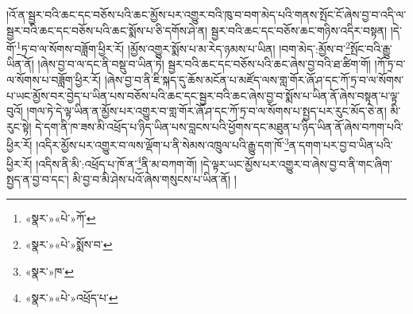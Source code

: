 །འོ་ན་སྦྱར་བའི་ཆང་དང་བཅོས་པའི་ཆང་མྱོས་པར་འགྱུར་བའི་ཁུ་བ་བག་མེད་པའི་གནས་སྤོང་ངོ་ཞེས་བྱ་བ་འདི་ལ་སྦྱར་བའི་ཆང་དང་བཅོས་པའི་ཆང་སྨོས་པ་ཅི་དགོས་ཤེ་ན། སྦྱར་བའི་ཆང་དང་བཅོས་ཆང་གཉིས་འདིར་བསྟན། །དེ་གོ་\footnote{«སྣར་»«པེ་»ཀོ་}ཏྲ་བ་ལ་སོགས་བཟློག་ཕྱིར་རོ། །མྱོས་འགྱུར་སྨོས་པ་མ་རེད་ཉམས་པ་ཡིན། །བག་མེད་:མྱོས་བ་\footnote{«སྣར་»«པེ་»སྨོས་བ་}སྤོང་བའི་རྒྱུ་ཡིན་ནོ། །ཞེས་བྱ་བ་ལ་དང་ནི་བསྡུ་བ་ཡིན་ཏེ། སྦྱར་བའི་ཆང་དང་བཅོས་པའི་ཆང་ཞེས་བྱ་བའི་ཐ་ཚིག་གོ། །ཀོ་ཏྲ་བ་ལ་སོགས་པ་བཟློག་ཕྱིར་རོ། །ཞེས་བྱ་བ་ནི་ཇི་སྐད་དུ་ཆོས་མངོན་པ་མཛོད་ལས་གླ་གོར་ཞོ་ཤ་དང་ཀོ་ཏྲ་བ་ལ་སོགས་པ་ཡང་མྱོས་བར་བྱེད་པ་ཡིན་པས་བཅོས་པའི་ཆང་དང་སྦྱར་བའི་ཆང་ཞེས་བྱ་བ་སྨོས་པ་ཡིན་ནོ་ཞེས་བསྟན་པ་ལྟ་བུའོ། །གལ་ཏེ་དེ་ལྟ་ཡིན་ན་མྱོས་པར་འགྱུར་བ་གླ་གོར་ཞོ་ཤ་དང་ཀོ་ཏྲ་བ་ལ་སོགས་པ་སྤྱད་པར་རུང་མོད་ཅེ་ན། མི་རུང་སྟེ། དེ་དག་ནི་ཁ་ཟས་མི་འཕྲོད་པ་ཉིད་ཡིན་པས་བླངས་པའི་ཕྱོགས་དང་མཐུན་པ་ཉིད་ཡིན་ནོ་ཞེས་བཀག་པའི་ཕྱིར་རོ། །འདིར་མྱོས་པར་འགྱུར་བ་ལས་ལྡོག་པ་ནི་སེམས་འཁྲུལ་པའི་རྒྱུ་དག་ཁོ་\footnote{«སྣར་»ཁ་}ན་དགག་པར་བྱ་བ་ཡིན་པའི་ཕྱིར་རོ། །འདིས་ནི་མི་:འཕྲོད་པ་ཁོ་ན་\footnote{«སྣར་»«པེ་»འཕྲོད་པ་}ནི་མ་བཀག་གོ། །དེ་ལྟར་ཡང་མྱོས་པར་འགྱུར་བ་ཞེས་བྱ་བ་ནི་གང་ཞིག་སྤྱད་ན་བྱ་བ་དང་། མི་བྱ་བ་མི་ཤེས་པའོ་ཞེས་གསུངས་པ་ཡིན་ནོ། །
